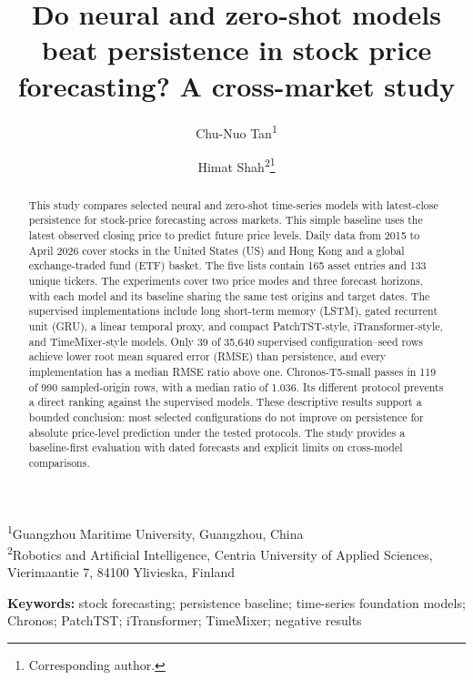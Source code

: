 \documentclass[11pt]{article}
\title{Do neural and zero-shot models beat persistence in stock price forecasting? A cross-market study}
\author{Chu-Nuo Tan\textsuperscript{1} \and Himat Shah\textsuperscript{2}\thanks{Corresponding author.}}
\date{}
\begin{document}
\maketitle
\begin{center}
\small
\textsuperscript{1}Guangzhou Maritime University, Guangzhou, China\\[0.4em]
\textsuperscript{2}Robotics and Artificial Intelligence, Centria University of Applied Sciences,\\
Vierimaantie 7, 84100 Ylivieska, Finland
\end{center}

\begin{abstract}
This study compares selected neural and zero-shot time-series models with latest-close persistence for stock-price forecasting across markets. This simple baseline uses the latest observed closing price to predict future price levels. Daily data from 2015 to April 2026 cover stocks in the United States (US) and Hong Kong and a global exchange-traded fund (ETF) basket. The five lists contain 165 asset entries and 133 unique tickers. The experiments cover two price modes and three forecast horizons, with each model and its baseline sharing the same test origins and target dates. The supervised implementations include long short-term memory (LSTM), gated recurrent unit (GRU), a linear temporal proxy, and compact PatchTST-style, iTransformer-style, and TimeMixer-style models. Only 39 of 35,640 supervised configuration--seed rows achieve lower root mean squared error (RMSE) than persistence, and every implementation has a median RMSE ratio above one. Chronos-T5-small passes in 119 of 990 sampled-origin rows, with a median ratio of 1.036. Its different protocol prevents a direct ranking against the supervised models. These descriptive results support a bounded conclusion: most selected configurations do not improve on persistence for absolute price-level prediction under the tested protocols. The study provides a baseline-first evaluation with dated forecasts and explicit limits on cross-model comparisons.
\end{abstract}

\noindent\textbf{Keywords:} stock forecasting; persistence baseline; time-series foundation models; Chronos; PatchTST; iTransformer; TimeMixer; negative results










\FloatBarrier

\end{document}
